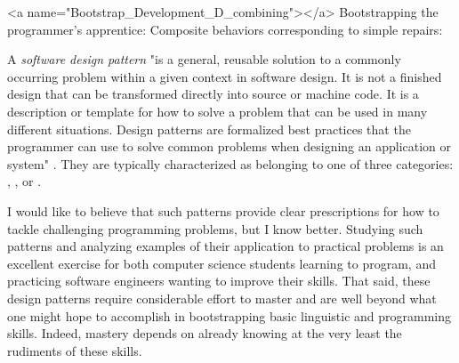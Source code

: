 \rawhtml
<a name="Bootstrap_Development_D_combining"></a>
\endrawhtml
Bootstrapping the programmer's apprentice: Composite behaviors corresponding to simple repairs:

A {\it{software design pattern}} "is a general, reusable solution to a commonly occurring problem within a given context in software design. It is not a finished design that can be transformed directly into source or machine code. It is a description or template for how to solve a problem that can be used in many different situations. Design patterns are formalized best practices that the programmer can use to solve common problems when designing an application or system" \emdash{} {}. They are typically characterized as belonging to one of three categories: 
{},
{}, or
{}.

I would like to believe that such patterns provide clear prescriptions for how to tackle challenging programming problems, but I know better. Studying such patterns and analyzing examples of their application to practical problems is an excellent exercise for both computer science students learning to program, and practicing software engineers wanting to improve their skills. That said, these design patterns require considerable effort to master and are well beyond what one might hope to accomplish in bootstrapping basic linguistic and programming skills. Indeed, mastery depends on already knowing \emdash{} at the very least \emdash{} the rudiments of these skills. 


